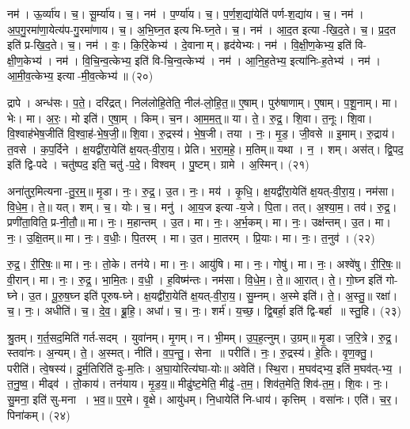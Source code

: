 नम॑। ऊ॒र्व्या॑य। च॒। सू॒र्म्या॑य। च॒। 
नम॑। प॒र्ण्या॑य। च॒। प॒र्ण॒श॒द्या॑येति॑ पर्ण-श॒द्या॑य। च॒। 
नम॑। अ॒प॒गु॒रमा॑णा॒येत्य॑प-गु॒रमा॑णाय। च॒। अ॒भि॒घ्न॒त इत्यभि-घ्न॒ते। च॒। 
नम॑। \mbox{आ॒\akhkhi{}द॒त} इत्या-खि॒द॒ते। च॒। \mbox{प्र॒\akhkhi{}द॒त} इति॑ प्र-खि॒द॒ते। च॒। 
नम॑। वः॒। कि॒रि॒केभ्य॑। दे॒वानाम्। हृद॑येभ्यः। नम॑। 
वि॒क्षी॒ण॒केभ्य॒ इति॑ वि-क्षी॒ण॒केभ्य॑। नम॑। वि॒चि॒न्व॒त्केभ्य॒ इति॑ वि-चि॒न्व॒त्केभ्य॑। नम॑। 
आ॒नि॒\ar{}ह॒तेभ्य॒ इत्या॑निः-ह॒तेभ्य॑। नम॑। आ॒मी॒व॒त्केभ्य॒ इत्या-मी॒व॒त्केभ्य॑॥ (२०)


द्रापे। अन्ध॑सः। प॒ते॒। दरि॑द्रत्। निल॑लोहि॒तेति॒ नील॑-लो॒हि॒त॒॥ 
ए॒षाम्। पुरु॑षाणाम्। ए॒षाम्। प॒शू॒नाम्। मा। भेः। मा। अ॒रः॒। मो इति॑। ए॒षा॒म्। किम्। च॒न। आ॒म॒म॒त्॒॥ 
या। ते॒। रु॒द्र॒। शि॒वा। त॒नूः। शि॒वा। वि॒श्वाह॑भेष॒जीति॑ वि॒श्वा॒ह॑-भे॒ष॒जी॒॥ 
शि॒वा। रु॒द्रस्य॑। भे॒ष॒जी। तया। नः॒। मृ॒ड॒। जी॒वसे॥ 
इ॒माम्। रु॒द्राय॑। त॒वसे। क॒प॒र्दिने। क्ष॒यद्वी॑रा॒येति॑ क्ष॒यत्-वी॒रा॒य॒। प्रेति। भ॒रा॒म॒हे॒। म॒तिम्॥ 
यथा। न॒। शम्। अस॑त्। द्वि॒पद॒ इति॑ द्वि-पदे। चतु॑ष्पद॒ इति॒ चतु॑-प॒दे॒। विश्वम्। पु॒ष्टम्। ग्रामे। अ॒स्मिन्। (२१)


अना॑तुर॒मित्यना-तु॒र॒म्॒॥ 
मृ॒डा। नः॒। रु॒द्र॒। उ॒त। नः॒। मय॑। कृ॒धि॒। क्ष॒यद्वी॑रा॒येति॑ क्ष॒यत्-वी॒रा॒य॒। नम॑सा। वि॒धे॒म॒। ते॒॥ 
यत्। शम्। च॒। योः। च॒। मनु॑। आ॒य॒ज इत्या-य॒जे। पि॒ता। तत्। अ॒श्या॒म॒। तव॑। रु॒द्र॒। प्रणी॑ता॒विति॒ प्र-नी॒तौ॒॥ 
मा। नः॒। म॒हान्तम्। उ॒त। मा। नः॒। अ॒र्भ॒कम्। मा। नः॒। उक्ष॑न्तम्। उ॒त। मा। नः॒। उ॒क्षि॒तम्॥ 
मा। नः॒। व॒धीः॒। पि॒तरम्। मा। उ॒त। मा॒तरम्। प्रि॒याः। मा। नः॒। त॒नुव॑। (२२)


रु॒द्र॒। री॒रि॒षः॒॥ 
मा। नः॒। तो॒के। तन॑ये। मा। नः॒। आयु॑षि। मा। नः॒। गोषु॑। मा। नः॒। अश्वे॑षु। री॒रि॒षः॒॥ 
वी॒रान्। मा। नः॒। रु॒द्र॒। भा॒मि॒तः। व॒धी॒। ह॒विष्म॑न्तः। नम॑सा। वि॒धे॒म॒। ते॒॥ 
आ॒रात्। ते॒। गो॒घ्न इति॑ गो-घ्ने। उ॒त। पू॒रु॒ष॒घ्न इति॑ पूरुष-घ्ने। क्ष॒यद्वी॑रा॒येति॑ क्ष॒यत्-वी॒रा॒य॒। सु॒म्नम्। अ॒स्मे इति॑। ते॒। अ॒स्तु॒॥ 
रक्षा॑। च॒। नः॒। अधीति॑। च॒। दे॒व॒। ब्रू॒हि॒। अधा॑। च॒। नः॒। शर्म॑। य॒च्छ॒। द्वि॒बर्हा॒ इति॑ द्वि-बर्हा॥ 
स्तु॒हि। (२३)


श्रु॒तम्। ग॒र्त॒सद॒मिति॑ गर्त-सदम्। युवा॑नम्। मृ॒गम्। न। भी॒मम्। उ॒प॒ह॒त्नुम्। उ॒ग्रम्॥ 
मृ॒डा। ज॒रि॒त्रे। रु॒द्र॒। स्तवा॑नः। अ॒न्यम्। ते॒। अ॒स्मत्। नीति॑। व॒प॒न्तु॒। सेना॥ 
परीति॑। नः॒। रु॒द्रस्य॑। हे॒तिः। वृ॒ण॒क्तु॒। परीति॑। त्वे॒षस्य॑। दु॒र्म॒तिरिति॑ दुः-म॒तिः। अ॒घा॒योरित्य॑घा-योः॥ 
अवेति॑। स्थि॒रा। म॒घव॑द्भ्य॒ इति॑ म॒घव॑त्-भ्य॒। त॒नु॒ष्व॒। मीढ्व॑। तो॒काय॑। तन॑याय। मृ॒ड॒य॒॥ 
मीढु॑ष्ट॒मेति॒ मीढु॑-त॒म॒। शिव॑त॒मेति॒ शिव॑-त॒म॒। शि॒वः। नः॒। सु॒मना॒ इति॑ सु-मना। भ॒व॒॥ 
प॒र॒मे। वृ॒क्षे। आयु॑धम्। नि॒धायेति॑ नि-धाय॑। कृत्तिम्। वसा॑नः। एति॑। च॒र॒। पिना॑कम्। (२४)


